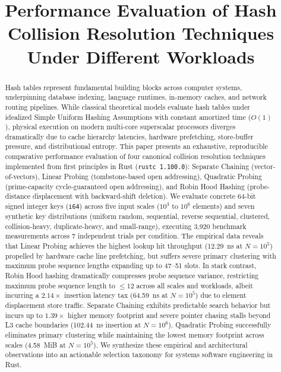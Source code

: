 \documentclass[conference]{IEEEtran}
\title{Performance Evaluation of Hash Collision Resolution Techniques Under Different Workloads}
\author{\IEEEauthorblockN{Aditya Kumar Harishankar Prasad}}
\begin{document}
\maketitle

\begin{abstract}
Hash tables represent fundamental building blocks across computer systems, underpinning database indexing, language runtimes, in-memory caches, and network routing pipelines. While classical theoretical models evaluate hash tables under idealized Simple Uniform Hashing Assumptions with constant amortized time ($O(1)$), physical execution on modern multi-core superscalar processors diverges dramatically due to cache hierarchy latencies, hardware prefetching, store-buffer pressure, and distributional entropy. This paper presents an exhaustive, reproducible comparative performance evaluation of four canonical collision resolution techniques implemented from first principles in Rust (\texttt{rustc 1.100.0}): Separate Chaining (vector-of-vectors), Linear Probing (tombstone-based open addressing), Quadratic Probing (prime-capacity cycle-guaranteed open addressing), and Robin Hood Hashing (probe-distance displacement with backward-shift deletion). We evaluate concrete 64-bit signed integer keys (\texttt{i64}) across five input scales ($10^3$ to $10^6$ elements) and seven synthetic key distributions (uniform random, sequential, reverse sequential, clustered, collision-heavy, duplicate-heavy, and small-range), executing 3,920 benchmark measurements across 7 independent trials per condition. The empirical data reveals that Linear Probing achieves the highest lookup hit throughput (12.29~ns at $N = 10^5$) propelled by hardware cache line prefetching, but suffers severe primary clustering with maximum probe sequence lengths expanding up to 47--51 slots. In stark contrast, Robin Hood hashing dramatically compresses probe sequence variance, restricting maximum probe sequence length to $\le 12$ across all scales and workloads, albeit incurring a $2.14\times$ insertion latency tax (64.59~ns at $N = 10^5$) due to element displacement store traffic. Separate Chaining exhibits predictable search behavior but incurs up to $1.39\times$ higher memory footprint and severe pointer chasing stalls beyond L3 cache boundaries (102.44~ns insertion at $N = 10^6$). Quadratic Probing successfully eliminates primary clustering while maintaining the lowest memory footprint across scales (4.58~MiB at $N = 10^5$). We synthesize these empirical and architectural observations into an actionable selection taxonomy for systems software engineering in Rust.
\end{abstract}
\end{document}
